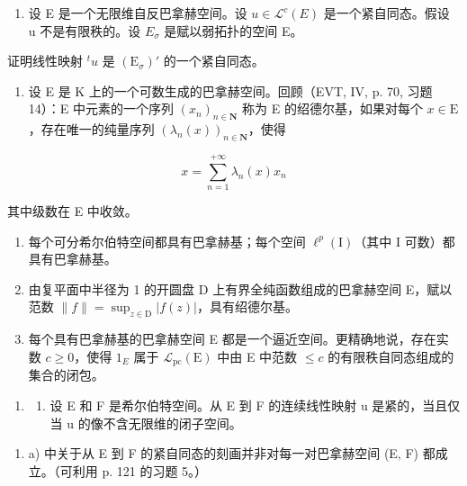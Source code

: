 \begin{enumerate}
\def\labelenumi{\arabic{enumi})}
\setcounter{enumi}{11}
\tightlist
\item
  设 E 是一个无限维自反巴拿赫空间。设 \(u \in \mathcal{L}^{c}(E)\) 是一个紧自同态。假设 u 不是有限秩的。设 \(E_{\sigma}\) 是赋以弱拓扑的空间 E。
\end{enumerate}

证明线性映射 \(^{t}u\) 是 \((\mathrm{E}_{\sigma})'\) 的一个紧自同态。

\begin{enumerate}
\def\labelenumi{\arabic{enumi})}
\setcounter{enumi}{12}
\tightlist
\item
  设 E 是 K 上的一个可数生成的巴拿赫空间。回顾（EVT, IV, p. 70, 习题 14）：E 中元素的一个序列 \((x_{n})_{n\in \mathbf{N}}\) 称为 E 的绍德尔基，如果对每个 \(x\in \mathrm{E}\) ，存在唯一的纯量序列 \((\lambda_n(x))_{n\in \mathbf{N}}\)，使得
\end{enumerate}

\[
x = \sum_ {n = 1} ^ {+ \infty} \lambda_ {n} (x) x _ {n}
\]

其中级数在 E 中收敛。

\begin{enumerate}
\def\labelenumi{\alph{enumi})}
\item
  每个可分希尔伯特空间都具有巴拿赫基；每个空间 \(\ell^{p}(\mathrm{I})\)（其中 I 可数）都具有巴拿赫基。
\item
  由复平面中半径为 1 的开圆盘 D 上有界全纯函数组成的巴拿赫空间 E，赋以范数 \(\| f \| = \sup_{z \in \mathrm{D}} |f(z)|\)，具有绍德尔基。
\item
  每个具有巴拿赫基的巴拿赫空间 E 都是一个逼近空间。更精确地说，存在实数 \(c \geqslant 0\)，使得 \(1_{E}\) 属于 \(\mathcal{L}_{\mathrm{pc}}(\mathrm{E})\) 中由 E 中范数 \(\leqslant c\) 的有限秩自同态组成的集合的闭包。
\end{enumerate}

\begin{enumerate}
\def\labelenumi{\arabic{enumi})}
\setcounter{enumi}{13}
\tightlist
\item
  \begin{enumerate}
  \def\labelenumii{\alph{enumii})}
  \tightlist
  \item
    设 E 和 F 是希尔伯特空间。从 E 到 F 的连续线性映射 u 是紧的，当且仅当 u 的像不含无限维的闭子空间。
  \end{enumerate}
\end{enumerate}

\begin{enumerate}
\def\labelenumi{\alph{enumi})}
\setcounter{enumi}{1}
\tightlist
\item
  a) 中关于从 E 到 F 的紧自同态的刻画并非对每一对巴拿赫空间 (E, F) 都成立。（可利用 p. 121 的习题 5。）
\end{enumerate}

